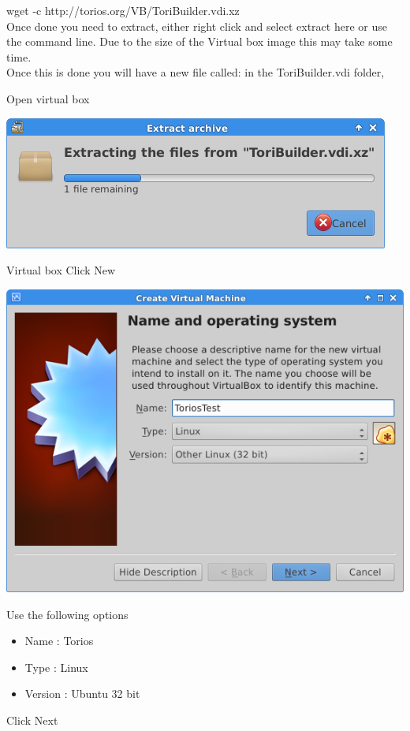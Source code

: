 \documentclass[12pt,a4paper]{book}
\begin{document}
wget -c http://torios.org/VB/ToriBuilder.vdi.xz \\

Once done you need to extract,   either right click and select extract here or use the command line.  Due to the size of the Virtual box image this may take some time. \\

Once this is done you will have a new file called:    in the ToriBuilder.vdi folder,  


Open virtual box

\begin{center}
\includegraphics[width=0.7\linewidth]{extractVBimage}
\end{center}

Virtual box 
Click New

\begin{center}
\item \includegraphics[width=0.7\linewidth]{ToriosTest01}
\end{center}

Use the following options
\begin{itemize}
\item Name : Torios
\item Type : Linux
\item Version : Ubuntu 32 bit
\end{itemize}

Click Next
\end{document}
